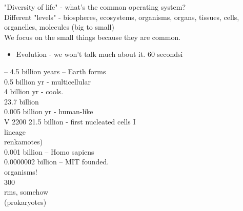 \documentclass{article}
\begin{document}
"Diversity of life" - what's the common operating system?\\
Different "levels" - biospheres, ecosystems, organisms, organs, tissues, cells,\\
organelles, molecules (big to small)\\
We focus on the small things because they are common.
\begin{itemize}
\item  Evolution - we won't talk much about it. 60 secondsi
\end{itemize}
– 4.5 billion years – Earth forms\\
0.5 billion yr - multicellular\\
4 billion yr - cools.\\
23.7 billion\\
0.005 billion yr - human-like\\
V 2200 21.5 billion - first nucleated cells I\\
lineage\\
renkamotes)\\
0.001 billion – Homo sapiens\\
0.0000002 billion – MIT founded.\\
organisms!\\
300\\
rms, somehow\\
(prokaryotes)\\
\end{document}

